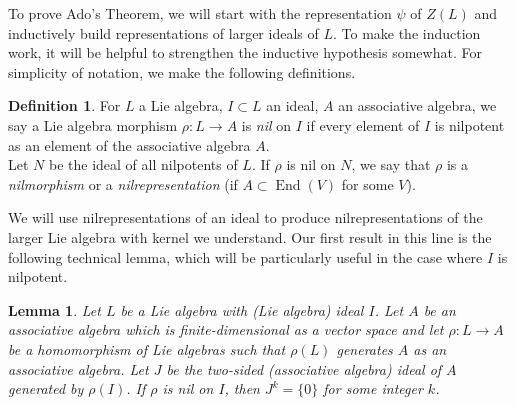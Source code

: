 \documentclass[10pt]{amsart}
\newtheorem{lem}[thm]{Lemma}
\theoremstyle{definition}
\newtheorem{definition}[thm]{Definition}
\theoremstyle{remark}
\numberwithin{equation}{section}
\DeclareMathOperator{\End}{End}
\begin{document}
To prove Ado's Theorem, we will start with the representation $\psi$ of $Z(L)$ and inductively build representations of larger ideals of $L$. To make the induction work, it will be helpful to strengthen the inductive hypothesis somewhat. For simplicity of notation, we make the following definitions.

\begin{definition}
For $L$ a Lie algebra, $I\subset L$ an ideal, $A$ an associative algebra, we say a Lie algebra morphism $\rho: L \to A$ is \emph{nil} on $I$ if every element of $I$ is nilpotent as an element of the associative algebra $A$.\\
Let $N$ be the ideal of all nilpotents of $L$. If $\rho$ is nil on $N$, we say that $\rho$ is a \emph{nilmorphism} or a \emph{nilrepresentation} (if $A \subset \End(V)$ for some $V$).
\end{definition}

We will use nilrepresentations of an ideal to produce nilrepresentations of the larger Lie algebra with kernel we understand. Our first result in this line is the following technical lemma, which will be particularly useful in the case where $I$ is nilpotent.


\begin{lem} \label{lem:PowerOfIdealIsZero}
 Let $L$ be a Lie algebra with (Lie algebra) ideal $I$. Let $A$ be an associative algebra which is finite-dimensional as a vector space and let $\rho: L \to A$ be a homomorphism of Lie algebras such that $\rho(L)$ generates $A$ as an associative algebra. Let $J$ be the two-sided (associative algebra) ideal of $A$ generated by $\rho(I)$. If $\rho$ is nil on $I$, then $J^{k} = \{0\}$ for some integer $k$.
\end{lem}
\end{document}
